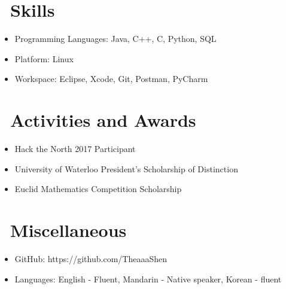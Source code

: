 \documentclass{resume}
\begin{document}
\section{\faCogs\ Skills}
\begin{itemize}[parsep=0.5ex]
  \item Programming Languages: Java, C++, C, Python, SQL
  \item Platform: Linux
  \item Workspace: Eclipse, Xcode, Git, Postman, PyCharm
\end{itemize}

\section{\faHeartO\ Activities and Awards}
\begin{itemize}[parsep=0.5ex]
  \item Hack the North 2017 Participant
  \item University of Waterloo President’s Scholarship of Distinction
  \item Euclid Mathematics Competition Scholarship
\end{itemize}

\section{\faInfo\ Miscellaneous}
\begin{itemize}[parsep=0.5ex]
  \item GitHub: https://github.com/TheaaaShen
  \item Languages: English - Fluent, Mandarin - Native speaker, Korean -  fluent
\end{itemize}
\end{document}
